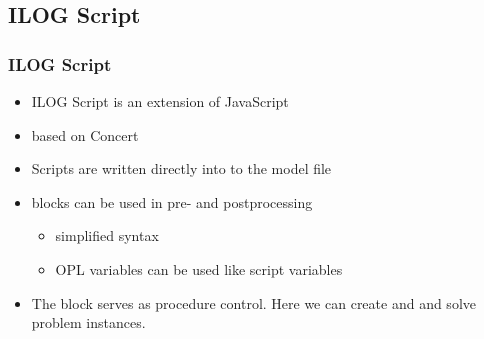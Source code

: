 \subsection{ILOG Script}
\begin{frame}
 \frametitle{ILOG Script}
 \begin{itemize}
  \item ILOG Script is an extension of JavaScript
  \item based on Concert
  \item Scripts are written directly into to the model file
  \item {} blocks can be used in pre- and postprocessing
  \begin{itemize}
   \item simplified syntax
   \item OPL variables can be used like script variables
  \end{itemize}
  \item The  block serves as procedure control. Here we can create and and solve problem instances.
 \end{itemize}
\end{frame}
